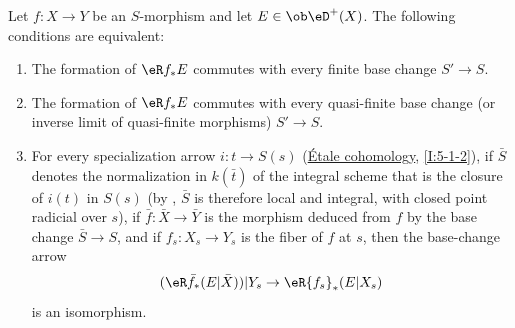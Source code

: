 \begin{proposition}\label{VII:5-1-1}
Let $f:X\to Y$ be an $S$-morphism and let $E\in\ob \eD^+(X)$. The following
conditions are equivalent:
\begin{enumerate}[\indent (i)]
  \item The formation of $\eR f_\ast E$ commutes with every finite base change
    $S'\to S$.
  \item The formation of $\eR f_\ast E$ commutes with every quasi-finite base
    change (or inverse limit of quasi-finite morphisms) $S'\to S$.
  \item For every specialization arrow $i:t\to S(s)$
    (\hyperref[I]{Étale cohomology}, \ref{I:5-1-2}), if $\bar S$ denotes
    the normalization in $k(\bar t)$ of the integral scheme that is the
    closure of $i(t)$ in $S(s)$ (by
    \cite[IV, 6.15.5, 18.5.11, 18.8.16]{ega}, $\bar S$ is therefore local and
    integral, with closed point radicial over $s$), if
    $\bar f:\bar X\to \bar Y$ is the morphism deduced from $f$ by the base
    change $\bar S\to S$, and if $f_s:X_s\to Y_s$ is the fiber of $f$ at $s$,
    then the base-change arrow
    \[
      (\eR \bar f_\ast (E|\bar X))|Y_s \to \eR {f_s}_\ast(E|X_s) 
    \]
    is an isomorphism.
\end{enumerate}
\end{proposition}

